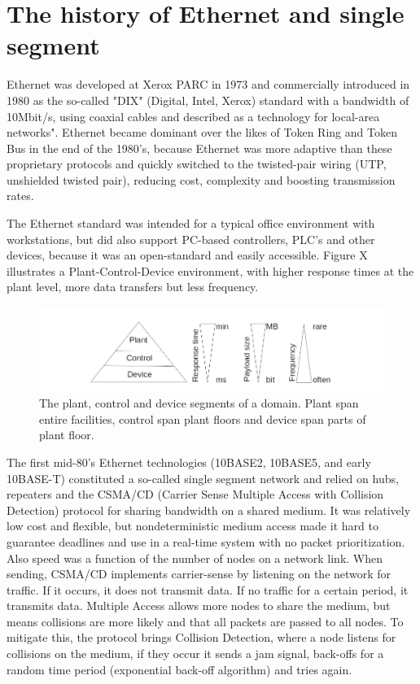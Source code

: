 \section{The history of Ethernet and single segment}

Ethernet was developed at Xerox PARC in 1973 and commercially introduced in 1980 as the so-called "DIX" (Digital, Intel, Xerox) standard with a bandwidth of 10Mbit/s, using coaxial cables and described as a technology for local-area networks". Ethernet became dominant over the likes of Token Ring and Token Bus in the end of the 1980's, because Ethernet was more adaptive than these proprietary protocols and quickly switched to the twisted-pair wiring (UTP, unshielded twisted pair), reducing cost, complexity and boosting transmission rates.

The Ethernet standard was intended for a typical office environment with workstations, but did also support PC-based controllers, PLC's and other devices, because it was an open-standard and easily accessible. Figure X illustrates a Plant-Control-Device environment, with higher response times at the plant level, more data transfers but less frequency.

\begin{figure}[h!]\label{}
	\centering
	\includegraphics[scale=0.5]{realTimeEthernet/PlantControlDevice.png}
	\caption{The plant, control and device segments of a domain. Plant span entire facilities, control span plant floors and device span parts of plant floor.}
	\label{fig:plantcontroldevice}
\end{figure}

The first mid-80's Ethernet technologies (10BASE2, 10BASE5, and early 10BASE-T) constituted a so-called single segment network and relied on hubs, repeaters and the CSMA/CD (Carrier Sense Multiple Access with Collision Detection) protocol for sharing bandwidth on a shared medium. It was relatively low cost and flexible, but nondeterministic medium access made it hard to guarantee deadlines and use in a real-time system with no packet prioritization. Also speed was a function of the number of nodes on a network link. When sending, CSMA/CD implements carrier-sense by listening on the network for traffic. If it occurs, it does not transmit data. If no traffic for a certain period, it transmits data. Multiple Access allows more nodes to share the medium, but means collisions are more likely and that all packets are passed to all nodes. To mitigate this, the protocol brings Collision Detection, where a node listens for collisions on the medium, if they occur it sends a jam signal, back-offs for a random time period (exponential back-off algorithm) and tries again.

